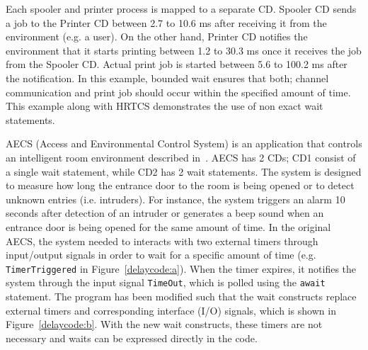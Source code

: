  Each spooler and printer process is mapped to a separate
CD. Spooler CD sends a job to the Printer CD between 2.7 to 10.6 ms
after receiving it from the environment (e.g. a user). On the other
hand, Printer CD notifies the environment that it starts printing
between 1.2 to 30.3 ms once it receives the job from the Spooler CD.
Actual print job is started between 5.6 to 100.2 ms after the
notification. In this example, bounded wait ensures that both; channel
communication and print job should occur within the specified amount of
time. This example along with HRTCS demonstrates the use of non exact
wait statements.

AECS (Access and Environmental Control System) is an application that
controls an intelligent room environment described in~\cite{aecs_ispa}.
AECS has 2 CDs; CD1 consist of a single wait statement, while CD2 has 2
wait statements. The system is designed to measure how long the entrance
door to the room is being opened or to detect unknown entries (i.e.
intruders). For instance, the system triggers an alarm 10 seconds after
detection of an intruder or generates a beep sound when an entrance door
is being opened for the same amount of time. In the original AECS, the
system needed to interacts with two external timers through input/output
signals in order to wait for a specific amount of time (e.g.
\texttt{TimerTriggered} in Figure~\ref{delaycode:a}). When the timer
expires, it notifies the system through the input signal
\texttt{TimeOut}, which is polled using the \texttt{await} statement.
The program has been modified such that the wait constructs replace
external timers and corresponding interface (I/O) signals, which is
shown in Figure~\ref{delaycode:b}.  With the new wait constructs, these
timers are not necessary and waits can be expressed directly in the
code.

